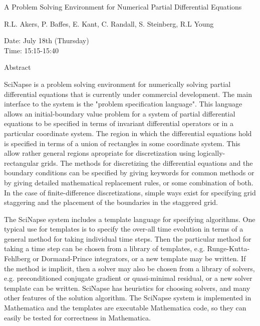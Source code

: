 \begin{center}
\LARGE
A Problem Solving Environment for Numerical Partial
                     Differential Equations
\end{center}

\begin{center}
\Large
R.L. Akers, P. Baffes, E. Kant, C. Randall, S. Steinberg, R.L Young

\end{center}

\noindent
Date:  July 18th (Thursday)\\
Time:  15:15-15:40\\

\begin{center}
\large
Abstract
\end{center}

SciNapse is a problem solving environment for numerically solving partial differential equations
that is currently under commercial development. The main interface to the system is the "problem
specification language". This language allows an initial-boundary value problem for a system of
partial differential equations to be specified in terms of invariant differential operators or in a
particular coordinate system. The region in which the differential equations hold is specified in
terms of a union of rectangles in some coordinate system. This allow rather general regions
apropriate for discretization using logically-rectangular grids. The methods for discretizing the
differential equations and the boundary conditions can be specified by giving keywords for
common methods or by giving detailed mathematical replacement rules, or some combination of
both. In the case of finite-difference discretizations, simple ways exist for specifying grid
staggering and the placement of the boundaries in the staggered grid. 

The SciNapse system includes a template language for specifying algorithms. One typical use for
templates is to specify the over-all time evolution in terms of a general method for taking
individual time steps. Then the particular method for taking a time step can be chosen from a
library of templates, e.g. Runge-Kutta-Fehlberg or Dormand-Prince integrators, or a new
template may be written. If the method is implicit, then a solver may also be chosen from a library
of solvers, e.g. preconditioned conjugate gradient or quasi-minimal residual, or a new solver
template can be written. SciNapse has heuristics for choosing solvers, and many other features of
the solution algorithm. The SciNapse system is implemented in Mathematica and the templates are
executable Mathematica code, so they can easily be tested for correctness in Mathematica. 

